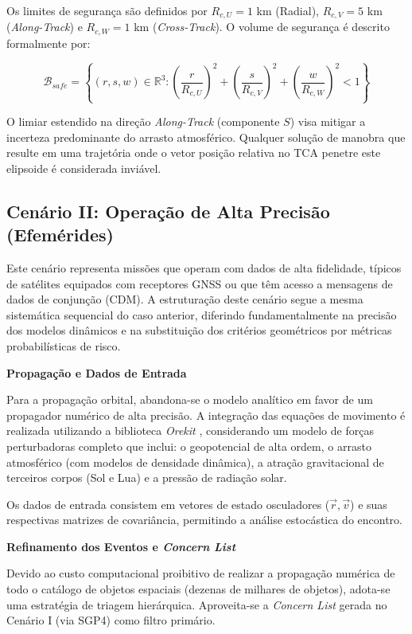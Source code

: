Os limites de segurança são definidos por $R_{c,U} = 1$ km (Radial), $R_{c,V} = 5$ km (\textit{Along-Track}) e $R_{c,W} = 1$ km (\textit{Cross-Track}). O volume de segurança é descrito formalmente por:

\begin{equation}
    \mathcal{B}_{safe} = \left\{ (r, s, w) \in \mathbb{R}^3 : \left(\frac{r}{R_{c,U}}\right)^2 + \left(\frac{s}{R_{c,V}}\right)^2 + \left(\frac{w}{R_{c,W}}\right)^2 < 1 \right\}
    \label{eq:ellipsoid_safe}
\end{equation}

O limiar estendido na direção \textit{Along-Track} (componente $S$) visa mitigar a incerteza predominante do arrasto atmosférico. Qualquer solução de manobra que resulte em uma trajetória onde o vetor posição relativa no TCA penetre este elipsoide é considerada inviável.

\subsection{Cenário II: Operação de Alta Precisão (Efemérides)}
\label{subsec:scenario_precision}

Este cenário representa missões que operam com dados de alta fidelidade, típicos de satélites equipados com receptores GNSS ou que têm acesso a mensagens de dados de conjunção (CDM). A estruturação deste cenário segue a mesma sistemática sequencial do caso anterior, diferindo fundamentalmente na precisão dos modelos dinâmicos e na substituição dos critérios geométricos por métricas probabilísticas de risco.

\textbf{Propagação e Dados de Entrada}

Para a propagação orbital, abandona-se o modelo analítico em favor de um propagador numérico de alta precisão. A integração das equações de movimento é realizada utilizando a biblioteca \textit{Orekit} \cite{Orekit}, considerando um modelo de forças perturbadoras completo que inclui: o geopotencial de alta ordem, o arrasto atmosférico (com modelos de densidade dinâmica), a atração gravitacional de terceiros corpos (Sol e Lua) e a pressão de radiação solar.

Os dados de entrada consistem em vetores de estado osculadores ($\vec{r}, \vec{v}$) e suas respectivas matrizes de covariância, permitindo a análise estocástica do encontro.

\textbf{Refinamento dos Eventos e \textit{Concern List}}

Devido ao custo computacional proibitivo de realizar a propagação numérica de todo o catálogo de objetos espaciais (dezenas de milhares de objetos), adota-se uma estratégia de triagem hierárquica. Aproveita-se a \textit{Concern List} gerada no Cenário I (via SGP4) como filtro primário.

